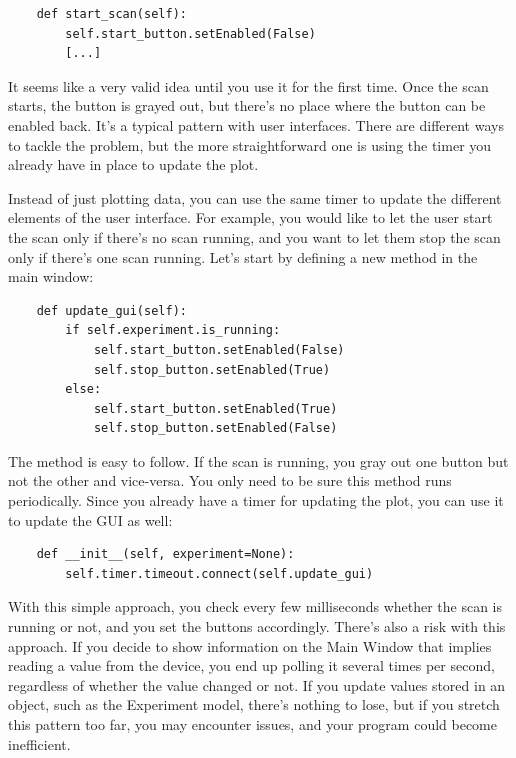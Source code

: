 \begin{verbatim}
    def start_scan(self):
        self.start_button.setEnabled(False)
        [...]
\end{verbatim}

It seems like a very valid idea until you use it for the first time. Once the scan starts, the button is grayed out, but there's no place where the button can be enabled back. It's a typical pattern with user interfaces. There are different ways to tackle the problem, but the more straightforward one is using the timer you already have in place to update the plot.

Instead of just plotting data, you can use the same timer to update the different elements of the user interface. For example, you would like to let the user start the scan only if there's no scan running, and you want to let them stop the scan only if there's one scan running. Let's start by defining a new method in the main window:

\begin{verbatim}
    def update_gui(self):
        if self.experiment.is_running:
            self.start_button.setEnabled(False)
            self.stop_button.setEnabled(True)
        else:
            self.start_button.setEnabled(True)
            self.stop_button.setEnabled(False)
\end{verbatim}

The method  is easy to follow. If the scan is running, you gray out one button but not the other and vice-versa. You only need to be sure this method runs periodically. Since you already have a timer for updating the plot, you can use it to update the GUI as well:

\begin{verbatim}
    def __init__(self, experiment=None):
        self.timer.timeout.connect(self.update_gui)
\end{verbatim}

With this simple approach, you check every few milliseconds whether the scan is running or not, and you set the buttons accordingly. There's also a risk with this approach. If you decide to show information on the Main Window that implies reading a value from the device, you end up polling it several times per second, regardless of whether the value changed or not. If you update values stored in an object, such as the Experiment model, there's nothing to lose, but if you stretch this pattern too far, you may encounter issues, and your program could become inefficient.

